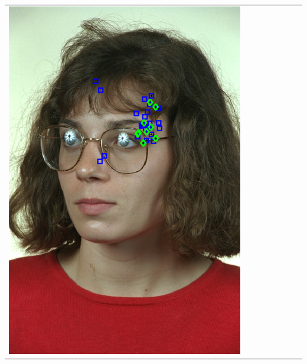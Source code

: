 \documentclass[landscape,final,a0paper,fontscale=0.27065]{baposter}
\begin{document}
\begin{poster}
{{\begin{tabular}{@{}rccccccc@{}}
 \parbox[c]{0.11\linewidth}{\includegraphics[width=\linewidth]{images/l_ql_fail.pdf}} &

\end{tabular}}}
\end{poster}
\end{document}
